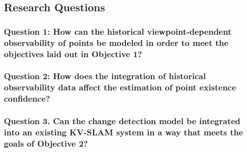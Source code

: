 \subsection{Research Questions}

\subsubsection*{Question 1: How can the historical viewpoint-dependent observability of points be modeled in order to meet the objectives laid out in Objective 1?}



\subsubsection*{Question 2: How does the integration of historical observability data affect the estimation of point existence confidence?}



\subsubsection*{Question 3. Can the change detection model be integrated into an existing KV-SLAM system in a way that meets the goals of Objective 2?}